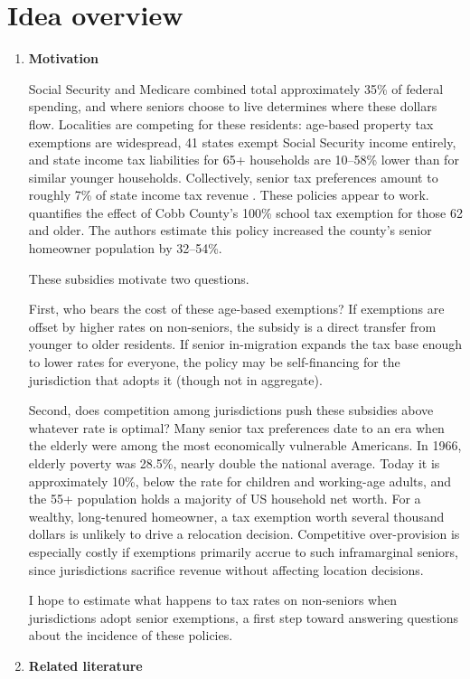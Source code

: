 \documentclass[11pt]{article}
\begin{document}
\section{Idea overview}
\begin{enumerate}
    \item \textbf{Motivation}

    Social Security and Medicare combined total approximately 35\% of federal spending, and where seniors choose to live determines where these dollars flow. Localities are competing for these residents: age-based property tax exemptions are widespread, 41 states exempt Social Security income entirely, and state income tax liabilities for 65+ households are 10--58\% lower than for similar younger households. Collectively, senior tax preferences amount to roughly 7\% of state income tax revenue \citep{BrewerConwayRork2017}. These policies appear to work.
   \cite{banzhaf2021age} quantifies the effect of Cobb County's 100\% school tax exemption for those 62 and older. The authors estimate this policy increased the county's senior homeowner population by 32–54\%.
    

    These subsidies motivate two questions. 
    
    First, who bears the cost of these age-based exemptions? If exemptions are offset by higher rates on non-seniors, the subsidy is a direct transfer from younger to older residents. If senior in-migration expands the tax base enough to lower rates for everyone, the policy may be self-financing for the jurisdiction that adopts it (though not in aggregate).
    
    Second, does competition among jurisdictions push these subsidies above whatever rate is optimal? Many senior tax preferences date to an era when the elderly were among the most economically vulnerable Americans. In 1966, elderly poverty was 28.5\%, nearly double the national average. Today it is approximately 10\%, below the rate for children and working-age adults, and the 55+ population holds a majority of US household net worth. For a wealthy, long-tenured homeowner, a tax exemption worth several thousand dollars is unlikely to drive a relocation decision. Competitive over-provision is especially costly if exemptions primarily accrue to such inframarginal seniors, since jurisdictions sacrifice revenue without affecting location decisions.

    I hope to estimate what happens to tax rates on non-seniors when jurisdictions adopt senior exemptions, a first step toward answering questions about the incidence of these policies. 
    \item \textbf{Related literature}
    

\end{enumerate}
\end{document}
